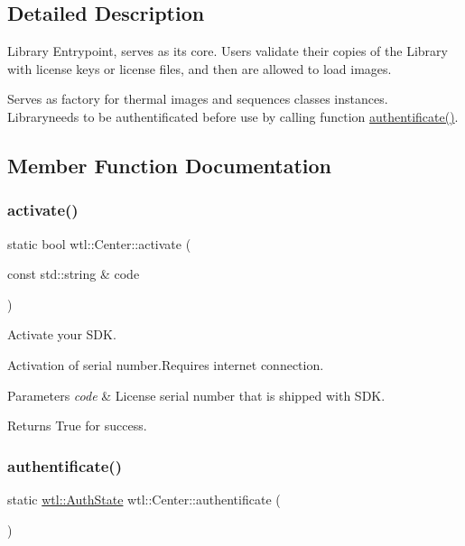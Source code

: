\subsection{Detailed Description}
Library Entrypoint, serves as its core. Users validate their copies of the Library with license keys or license files, and then are allowed to load images. 

Serves as factory for thermal images and sequences classes instances. Libraryneeds to be authentificated before use by calling function \hyperlink{classwtl_1_1_center_a1f1a7e622802706a8eef7ab781bc8efd}{authentificate()}. 

\subsection{Member Function Documentation}
\mbox{\label{classwtl_1_1_center_a96188b25e9a7d0b2c3ef54bae69f6190}} 
\subsubsection{\texorpdfstring{activate()}{activate()}}
{\footnotesize\ttfamily static bool wtl\+::\+Center\+::activate (\begin{DoxyParamCaption}\item[{const std\+::string \&}]{code }\end{DoxyParamCaption})\hspace{0.3cm}{\ttfamily [static]}}



Activate your S\+DK. 

Activation of serial number.\+Requires internet connection. 
\begin{DoxyParams}{Parameters}
{\em code} & License serial number that is shipped with S\+DK. \\
\hline
\end{DoxyParams}
\begin{DoxyReturn}{Returns}
True for success. 
\end{DoxyReturn}
\mbox{\label{classwtl_1_1_center_a1f1a7e622802706a8eef7ab781bc8efd}} 
\subsubsection{\texorpdfstring{authentificate()}{authentificate()}}
{\footnotesize\ttfamily static \hyperlink{namespacewtl_a74cc3b258b8e82a1d6e032fb4c937353}{wtl\+::\+Auth\+State} wtl\+::\+Center\+::authentificate (\begin{DoxyParamCaption}{ }\end{DoxyParamCaption})\hspace{0.3cm}{\ttfamily [static]}}



